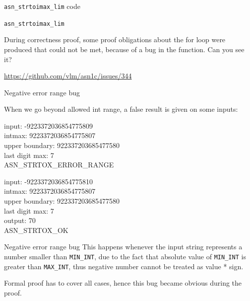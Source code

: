 \documentclass[10pt]{beamer}
\begin{document}
\begin{frame}{\texttt{asn\_strtoimax\_lim} code}
  
  {\fontsize{4}{1}\selectfont  }
  
\end{frame}


\begin{frame}{\texttt{asn\_strtoimax\_lim}}

   During correctness proof, some proof obligations about the for loop were produced that could not be met, because of a bug in the function. Can you see it?

  \url{https://github.com/vlm/asn1c/issues/344}
  
\end{frame}

\begin{frame}{Negative error range bug}

When we go beyond allowed int range, a false result is given on some inputs:  

input: -9223372036854775809 \\
intmax: 9223372036854775807 \\
upper boundary: 922337203685477580 \\
last digit max: 7\\
ASN\_STRTOX\_ERROR\_RANGE\\

\bigskip

input: -9223372036854775810 \\
intmax: 9223372036854775807 \\
upper boundary: 922337203685477580 \\ 
last digit max: 7 \\
output: 70 \\
ASN\_STRTOX\_OK


\end{frame}

\begin{frame}{Negative error range bug}
    This happens whenever the input string represents a number smaller than \texttt{MIN\_INT}, due to the fact that absolute value of \texttt{MIN\_INT} is greater than \texttt{MAX\_INT}, thus negative number cannot be treated as value * sign. 
    
    Formal proof has to cover all cases, hence this bug became obvious during the proof.
    
\end{frame}{}
\end{document}
